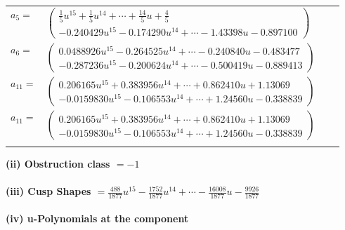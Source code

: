 \documentclass[1p]{elsarticle_modified}
\theoremstyle{definition}
\begin{document}
\begin{tabular}{m{7pt} m{180pt} m{7pt} m{180pt} }
\flushright $a_{5}=$&$\begin{pmatrix}\frac{1}{5} u^{15}+\frac{1}{5} u^{14}+\cdots+\frac{14}{5} u+\frac{4}{5}\\-0.240429 u^{15}-0.174290 u^{14}+\cdots-1.43398 u-0.897100\end{pmatrix}$ \\
\flushright $a_{6}=$&$\begin{pmatrix}0.0488926 u^{15}-0.264525 u^{14}+\cdots-0.240840 u-0.483477\\-0.287236 u^{15}-0.200624 u^{14}+\cdots-0.500419 u-0.889413\end{pmatrix}$ \\
\flushright $a_{11}=$&$\begin{pmatrix}0.206165 u^{15}+0.383956 u^{14}+\cdots+0.862410 u+1.13069\\-0.0159830 u^{15}-0.106553 u^{14}+\cdots+1.24560 u-0.338839\end{pmatrix}$\\ \flushright $a_{11}=$&$\begin{pmatrix}0.206165 u^{15}+0.383956 u^{14}+\cdots+0.862410 u+1.13069\\-0.0159830 u^{15}-0.106553 u^{14}+\cdots+1.24560 u-0.338839\end{pmatrix}$\\&\end{tabular}
\flushleft \textbf{(ii) Obstruction class $= -1$}\\~\\
\flushleft \textbf{(iii) Cusp Shapes $= \frac{488}{1877} u^{15}-\frac{1752}{1877} u^{14}+\cdots-\frac{16008}{1877} u-\frac{9926}{1877}$}\\~\\
\newpage\renewcommand{\arraystretch}{1}
\flushleft \textbf{(iv) u-Polynomials at the component}\newline \\
\end{document}
